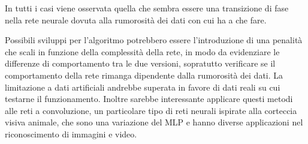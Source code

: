\documentclass[12pt,a4paper]{report}
\begin{document}
In tutti i casi viene osservata quella che sembra essere una transizione di fase nella rete neurale dovuta alla rumorosità dei dati con cui ha a che fare.

Possibili sviluppi per l'algoritmo potrebbero essere l'introduzione di una penalità che scali in funzione della complessità della rete, in modo da evidenziare le differenze di comportamento tra le due versioni, sopratutto verificare se il comportamento della rete rimanga dipendente dalla rumorosità dei dati.
La limitazione a dati artificiali andrebbe superata in favore di dati reali su cui testarne il funzionamento.
Inoltre sarebbe interessante applicare questi metodi alle reti a convoluzione, un particolare tipo di reti neurali ispirate alla corteccia visiva animale, che sono una variazione del MLP e hanno diverse applicazioni nel riconoscimento di immagini e video.

\listoffigures


\nocite{*}


\end{document}
